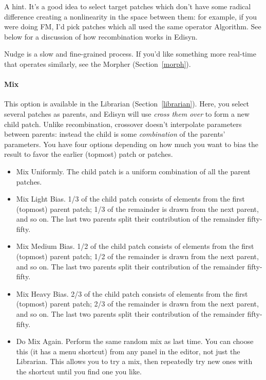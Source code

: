 \documentclass{article}
\begin{document}
A hint.  It's a good idea to select target patches which don't have some radical difference creating a nonlinearity in the space between them: for example, if you were doing FM, I'd pick patches which all used the same operator Algorithm.  See below for a discussion of how recombination works in Edisyn.

Nudge is a slow and fine-grained process.  If you'd like something more real-time that operates similarly, see the Morpher (Section~\ref{morph}).

\vspace{-0.6em}
\paragraph{Mix}  This option is available in the Librarian (Section~\ref{librarian}).  Here, you select several patches as parents, and Edisyn will use {\it cross them over} to form a new child patch.  Unlike recombination, crossover doesn't interpolate parameters between parents: instead the child is some {\it combination} of the parents' parameters.  You have four options depending on how much you want to bias the result to favor the earlier (topmost) patch or patches.

\enlargethispage{1em}

\vspace{-0.25em}
\begin{itemize}
\item Mix Uniformly.  The child patch is a uniform combination of all the parent patches.
\item Mix Light Bias.  1/3 of the child patch consists of elements from the first (topmost) parent patch; 1/3 of the remainder is drawn from the next parent, and so on.  The last two parents split their contribution of the remainder fifty-fifty.
\item Mix Medium Bias.  1/2 of the child patch consists of elements from the first (topmost) parent patch; 1/2 of the remainder is drawn from the next parent, and so on.  The last two parents split their contribution of the remainder fifty-fifty.
\item Mix Heavy Bias.  2/3 of the child patch consists of elements from the first (topmost) parent patch; 2/3 of the remainder is drawn from the next parent, and so on.  The last two parents split their contribution of the remainder fifty-fifty.
\item Do Mix Again.  Perform the same random mix as last time.  You can choose this (it has a menu shortcut) from any panel in the editor, not just the Librarian.  This allows you to try a mix, then repeatedly try new ones with the shortcut until you find one you like.
\end{itemize}
\end{document}
